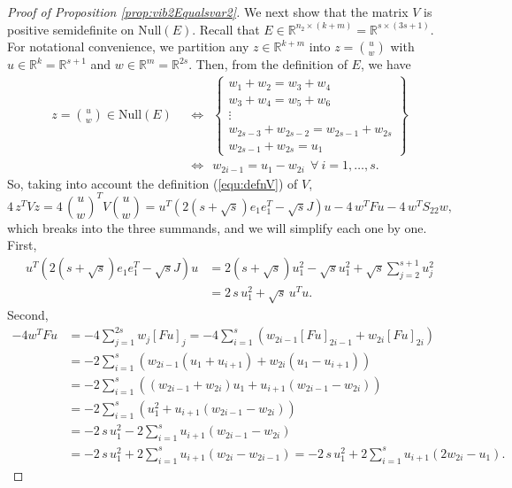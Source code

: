 \documentclass[12pt]{article}
\newcommand{\Null}{\mathrm{Null}}
\def\RR{{\mathbb{R}}}
\begin{document}
\begin{onehalfspace}
\begin{proof}[Proof of Proposition \ref{prop:vib2Equalsvar2}]
We next show that the matrix $V$ is positive semidefinite 
on $\Null(E)$. Recall that $E \in \RR^{n_2 \times (k+m)} = \RR^{s \times (3s+1)}$. For
notational convenience, we partition any $z \in \RR^{k+m}$ into $z = {u
\choose w}$ with $u \in \RR^k = \RR^{s+1}$ and $w \in \RR^m = \RR^{2s}$.
Then, from the definition of $E$, we have
\begin{align*}
z = {u \choose w} \in \Null(E)
\ \ &\Longleftrightarrow \ \
\left\{
    \begin{array}{l}
        w_1 + w_2 = w_3 + w_4 \\
        w_3 + w_4 = w_5 + w_6 \\
        \vdots \\
        w_{2s - 3} + w_{2s - 2} = w_{2s - 1} + w_{2s} \\
        w_{2s - 1} + w_{2s} = u_1
    \end{array}
\right\} \\
&\Longleftrightarrow \ \
w_{2i - 1} = u_1 - w_{2i} \ \ \forall \ i = 1, \ldots, s.
\end{align*}
So, taking into account the definition (\ref{equ:defnV}) of $V$,
\[
4 \, z^T Vz 
= 4 \, \textstyle{{u \choose w}}^T V {u \choose w}
= u^T \left( 2(s + \sqrt{s}) e_1e_1^T - \sqrt{s} J \right) u - 4 \, w^T F u - 4 \, w^T S_{22} w,
\]
which breaks into the three summands, and we will simplify each one by
one. First,
\begin{align*}
    u^T \left( 2(s + \sqrt{s}) e_1e_1^T - \sqrt{s} J \right) u
    &= 2(s + \sqrt{s}) u_1^2 - \sqrt{s} u_1^2 + \sqrt{s} \sum_{j=2}^{s+1} u_j^2 \\
    &= 2 \, s \, u_1^2 + \sqrt{s} \, u^T u.
\end{align*}
Second,
\begin{align*}
    -4w^T F u
    &= -4 \sum_{j = 1}^{2s} w_j [F u]_j
     = -4 \sum_{i = 1}^{s} \left( w_{2i - 1} [Fu]_{2i - 1} + w_{2i} [Fu]_{2i} \right) \\
    &= -2 \sum_{i = 1}^{s} \left( w_{2i - 1} (u_1 + u_{i+1}) + w_{2i} (u_1 - u_{i+1}) \right) \\
    &= -2 \sum_{i = 1}^{s} \left( (w_{2i - 1} + w_{2i}) u_1 + u_{i+1}(w_{2i-1} - w_{2i}) \right) \\
    &= -2 \sum_{i = 1}^{s} \left( u_1^2 + u_{i+1}(w_{2i-1} - w_{2i}) \right) \\
    &= -2 \, s \, u_1^2 - 2 \sum_{i = 1}^{s} u_{i+1}(w_{2i-1} - w_{2i}) \\
    &= -2 \, s \, u_1^2 + 2 \sum_{i = 1}^{s} u_{i+1}(w_{2i} - w_{2i-1})
     = -2 \, s \, u_1^2 + 2 \sum_{i = 1}^{s} u_{i+1}(2 w_{2i} - u_1).

\end{align*}
\end{proof}
\end{onehalfspace}
\end{document}
